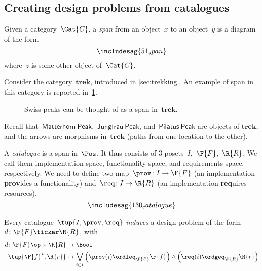 \subsection{Creating design problems from catalogues}
\begin{shaded}
\begin{definition}[Span]
Given a category~$\Cat{C}$, a \emph{span} from an object~$x$ to an object~$y$ is a diagram of the form
\begin{equation}
\includesag{51_span}
\end{equation}
where~$z$ is some other object of~$\Cat{C}$. 
\end{definition}
\end{shaded}
\begin{example}
Consider the category~$\mathbf{trek}$, introduced in \cref{sec:trekking}. An example of span in this category is reported in~\cref{fig:exmountains}.
\begin{figure}[h!]
\begin{center}
\end{center}
\caption{Swiss peaks can be thought of as a span in~$\mathbf{trek}$. \label{fig:exmountains}}
\end{figure}
Recall that~$\mathsf{Matterhorn \ Peak}$,~$\mathsf{Jungfrau \ Peak}$, and~$\mathsf{Pilatus \ Peak}$ are objects of $\mathbf{trek}$, and the arrows are morphisms in~$\mathbf{trek}$ (paths from one location to the other).
\end{example}

\begin{definition}[Catalogue] \label{def:catalogue}
A \emph{catalogue} is a span in~$\Pos$.
It thus consists of 3 posets~$I$,~$\F{F}$,~$\R{R}$.
We call them implementation space, functionality space, and requirements space, respectively. We need to define two map~$\prov \colon I \to \F{F}$ (an implementation \textbf{prov}ides a functionality) and~$\req\colon I \to \R{R}$ (an implementation \textbf{req}uires resources). 
\begin{equation}
\includesag{130_catalogue}
\end{equation}
\end{definition}

\begin{definition}
Every catalogue~$\tup{I,\prov,\req}$ \emph{induces} a design problem of the form~$d\colon \F{F}\tickar \R{R}$, with
\begin{equation}
    \begin{aligned}
    d\colon \F{F}\op \times \R{R}&\to \Bool\\
    \tup{\F{f}^*,\R{r}}&\mapsto \bigvee_{i\in I}\left(\prov(i)\ordleq_{\F{F}}\F{f} \right)\wedge \left( \req(i)\ordgeq_{\R{R}}\R{r}\right)
    \end{aligned}
\end{equation}
\end{definition}

